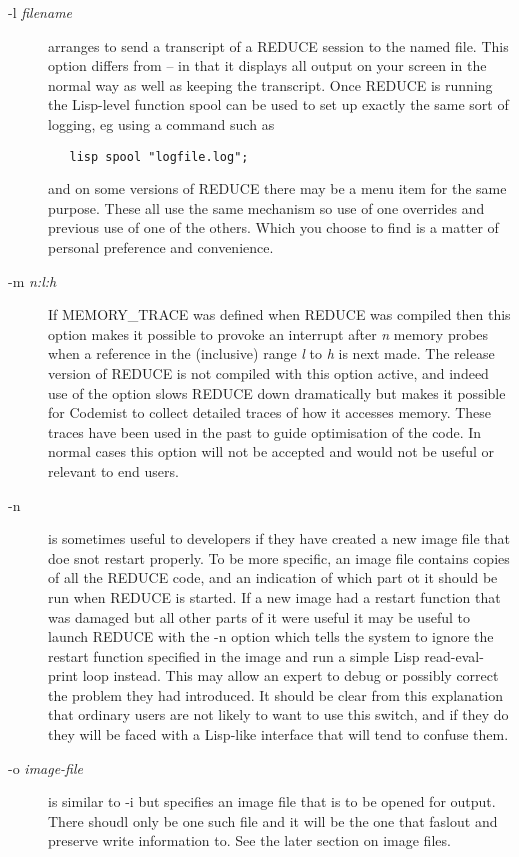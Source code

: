 \documentclass[a4paper,11pt]{article}
\begin{document}
\begin{description}
\item[{\ttfamily -l \rmfamily \slshape filename}] arranges to send a
transcript of a REDUCE session to the named file. This option differs
from {\ttfamily --} in that it displays all output on your screen in the
normal way as well as keeping the transcript. Once REDUCE is running the
Lisp-level function {\ttfamily spool} can be used to set up exactly the same
sort of logging, eg using a command such as
\begin{verbatim}
   lisp spool "logfile.log";
\end{verbatim}
\noindent and on some versions of REDUCE there may be a menu item for
the same purpose. These all use the same mechanism so use of one overrides
and previous use of one of the others. Which you choose to find is a matter
of personal preference and convenience.

\item[{\ttfamily -m \rmfamily \slshape n:l:h}]
If {\ttfamily MEMORY\_TRACE} was defined when REDUCE was compiled then 
this option makes it possible to provoke an interrupt
after {\slshape n} memory probes when a reference in the (inclusive)
range {\slshape l} to {\slshape h} is next made. The release version of REDUCE
is not compiled with this option active, and indeed use of the option slows
REDUCE down dramatically but makes it possible for Codemist to collect
detailed traces of how it accesses memory. These traces have been used in the
past to guide optimisation of the code.  In normal cases this option will
not be accepted and would not be useful or relevant to end users.


\item[{\ttfamily -n}] is sometimes useful to developers if they have
created a new image file that doe snot restart properly. To be more specific,
an image file contains copies of all the REDUCE code, and an indication of
which part ot it should be run when REDUCE is started. If a new image
had a restart function that was damaged but all other parts of it were
useful it may be useful to launch REDUCE with the {\ttfamily -n} option
which tells the system to ignore the restart function specified in the image
and run a simple Lisp read-eval-print loop instead. This may allow an expert
to debug or possibly correct the problem they had introduced.  It should
be clear from  this explanation that ordinary users are not likely to
want to use this switch, and if they do they will be faced with a Lisp-like
interface that will tend to confuse them.

\item[{\ttfamily -o \rmfamily \slshape image-file}] is similar to
{\ttfamily -i} but specifies an image file that is to be opened for
output. There shoudl only be one such file and it will be the one that
{\ttfamily faslout} and {\ttfamily preserve} write information to. See
the later section on image files.


\end{description}
\end{document}

